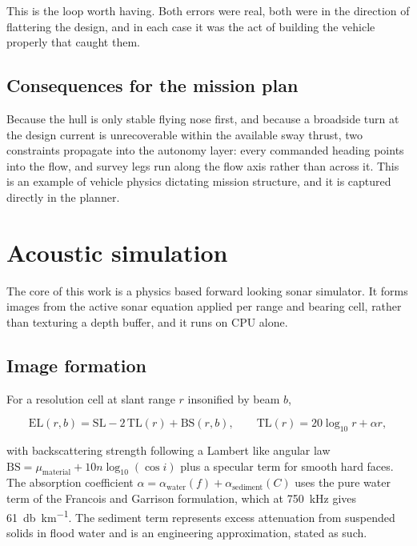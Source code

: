\documentclass[10pt,a4paper]{article}
\begin{document}
This is the loop worth having. Both errors were real, both were in the
direction of flattering the design, and in each case it was the act of building
the vehicle properly that caught them.

\subsection{Consequences for the mission plan}

Because the hull is only stable flying nose first, and because a broadside
turn at the design current is unrecoverable within the available sway thrust,
two constraints propagate into the autonomy layer: every commanded heading
points into the flow, and survey legs run along the flow axis rather than
across it. This is an example of vehicle physics dictating mission structure,
and it is captured directly in the planner.

\section{Acoustic simulation}

The core of this work is a physics based forward looking sonar simulator.
It forms images from the active sonar equation applied per range and bearing
cell, rather than texturing a depth buffer, and it runs on CPU alone.

\subsection{Image formation}

For a resolution cell at slant range $r$ insonified by beam $b$,

\begin{equation}
\mathrm{EL}(r,b) = \mathrm{SL} - 2\,\mathrm{TL}(r) + \mathrm{BS}(r,b),
\qquad
\mathrm{TL}(r) = 20\log_{10} r + \alpha r ,
\end{equation}

with backscattering strength following a Lambert like angular law
$\mathrm{BS} = \mu_{\text{material}} + 10 n \log_{10}(\cos i)$ plus a specular
term for smooth hard faces. The absorption coefficient
$\alpha = \alpha_{\text{water}}(f) + \alpha_{\text{sediment}}(C)$ uses the pure
water term of the Francois and Garrison formulation, which at
\SI{750}{\kilo\hertz} gives \SI{61}{\decibel\per\kilo\metre}. The sediment term
represents excess attenuation from suspended solids in flood water and is an
engineering approximation, stated as such.
\end{document}
